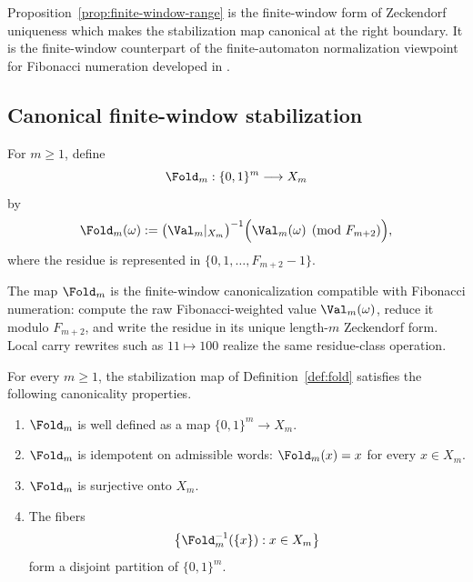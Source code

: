 \begin{remark}
Proposition~\ref{prop:finite-window-range} is the finite-window form of Zeckendorf uniqueness which makes the stabilization map canonical at the right boundary. It is the finite-window counterpart of the finite-automaton normalization viewpoint for Fibonacci numeration developed in \cite{Frougny1992,Berstel2001}.
\end{remark}

\subsection{Canonical finite-window stabilization}\label{sec:stab:fold}

\begin{definition}\label{def:fold}
For $m\ge1$, define
\[
\Fold_m:\{0,1\}^m\longrightarrow X_m
\]
by
\[
\Fold_m(\omega)
:=
\bigl(\Val_m|_{X_m}\bigr)^{-1}
\Bigl(\Val_m(\omega)\pmod {F_{m+2}}\Bigr),
\]
where the residue is represented in $\{0,1,\ldots,F_{m+2}-1\}$.
\end{definition}

\begin{remark}
The map $\Fold_m$ is the finite-window canonicalization compatible with Fibonacci numeration: compute the raw Fibonacci-weighted value $\Val_m(\omega)$, reduce it modulo $F_{m+2}$, and write the residue in its unique length-$m$ Zeckendorf form. Local carry rewrites such as $11\mapsto 100$ realize the same residue-class operation.
\end{remark}

\begin{theorem}\label{thm:fold-suite}
For every $m\ge1$, the stabilization map of Definition~\ref{def:fold}
satisfies the following canonicality properties.
\begin{enumerate}[label=(\roman*)]
  \item $\Fold_m$ is well defined as a map
  $\{0,1\}^m\to X_m$.
  \item $\Fold_m$ is idempotent on admissible words:
  $\Fold_m(x)=x$ for every $x\in X_m$.
  \item $\Fold_m$ is surjective onto $X_m$.
  \item The fibers
  \[
  \bigl\{\Fold_m^{-1}(\{x\}):x\in X_m\bigr\}
  \]
  form a disjoint partition of $\{0,1\}^m$.
\end{enumerate}
\end{theorem}

